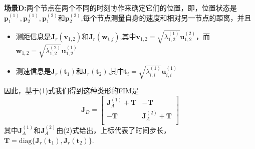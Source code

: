 \textbf{场景D:}两个节点在两个不同的时刻协作来确定它们的位置，即，位置状态是$\bm{p}_1^{(1)},\bm{p}_2^{(1)},\bm{p}_1^{(2)}$和$\bm{p}_2^{(2)}$,每个节点测量自身的速度和相对另一节点的距离，并且
\begin{itemize}  
\item 测距信息是$\bm{J}_r(\bm{v}_{1,2})$和$\bm{J}_r(\bm{w}_{i,j})$,其中$\bm{v}_{1,2}=\sqrt{\lambda_{1,2}^{(1)}}\bm{u}^{(2)}_{1,2}$，而$\bm{w}_{1,2}=\sqrt{\lambda_{1,2}^{(2)}}\bm{u}^{(1)}_{1,2}$
\item 测速信息是$\bm{J}_r(\bm{t}_1)$和$\bm{J}_r(\bm{t}_2)$,其中$\bm{t}_i=\sqrt{\lambda_{i,i}^{(1)}}\bm{u}^{(1)}_{i,i}$
\end{itemize}
因此，基于(1)式我们得到这种类形的FIM是
\[
\bm{J}_D=\left[
\begin{array}{cc}
\bm{J}^{(1)}_A+\bm{T}&-\bm{T}\\
-\bm{T}&\bm{J}^{(2)}_A+\bm{T}\\
\end{array}
\right]
\]
其中$\bm{J}^{(1)}_A$和$\bm{J}^{(2)}_A$由(2)式给出，上标代表了时间步长，$\bm{T}=\text{diag}\{\bm{J}_r(\bm{t}_1),\bm{J}_r(\bm{t}_2)\}$.
